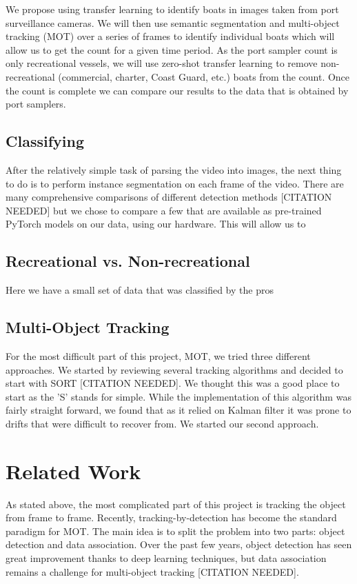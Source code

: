 \documentclass[10pt,twocolumn,letterpaper]{article}
\begin{document}
We propose using transfer learning to identify boats in images taken from port surveillance cameras. We will then use semantic segmentation and multi-object tracking (MOT) over a series of frames to identify individual boats which will allow us to get the count for a given time period.  As the port sampler count is only recreational vessels, we will use zero-shot transfer learning to remove non-recreational (commercial, charter, Coast Guard, etc.) boats from the count. Once the count is complete we can compare our results to the data that is obtained by port samplers.

\subsection{Classifying}

After the relatively simple task of parsing the video into images, the next thing to do is to perform instance segmentation on each frame of the video. There are many comprehensive comparisons of different detection methods [CITATION NEEDED] but we chose to compare a few that are available as pre-trained PyTorch models on our data, using our hardware. This will allow us to 

\subsection{Recreational vs. Non-recreational}

Here we have a small set of data that was classified by the pros

\subsection{Multi-Object Tracking}

For the most difficult part of this project, MOT, we tried three different approaches. We started by reviewing several tracking algorithms and decided to start with SORT [CITATION NEEDED]. We thought this was a good place to start as the 'S' stands for simple. While the implementation of this algorithm was fairly straight forward, we found that as it relied on Kalman filter it was prone to drifts that were difficult to recover from. We started our second approach.

\section{Related Work}

As stated above, the most complicated part of this project is tracking the object from frame to frame. Recently, tracking-by-detection has become the standard paradigm for MOT. The main idea is to split the problem into two parts: object detection and data association. Over the past few years, object detection has seen great
improvement thanks to deep learning techniques, but data association remains a challenge for multi-object tracking [CITATION NEEDED]. 
\end{document}
